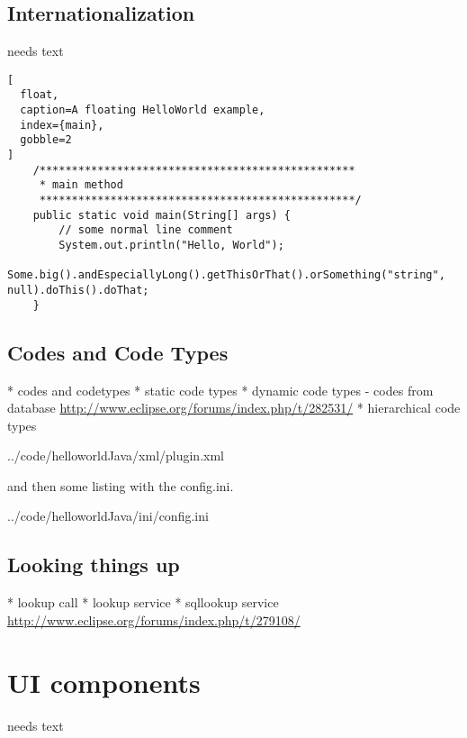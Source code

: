 \documentclass[a4paper,10pt,twoside]{book}
\begin{document}
\section{Internationalization}
needs text

\begin{lstlisting}[
  float,
  caption=A floating HelloWorld example,
  index={main},
  gobble=2
]
    /*************************************************
     * main method
     *************************************************/
    public static void main(String[] args) {
        // some normal line comment
        System.out.println("Hello, World");
        Some.big().andEspeciallyLong().getThisOrThat().orSomething("string", null).doThis().doThat;
    }
\end{lstlisting}

\section{Codes and Code Types}
  * codes and codetypes
  * static code types
  * dynamic code types
  - codes from database \url{http://www.eclipse.org/forums/index.php/t/282531/}
  * hierarchical code types


{../code/helloworldJava/xml/plugin.xml}

and then some listing with the config.ini.


{../code/helloworldJava/ini/config.ini}

\section{Looking things up}
  * lookup call
  * lookup service
  * sqllookup service
  \url{http://www.eclipse.org/forums/index.php/t/279108/}

\chapter{UI components}
needs text

\end{document}
